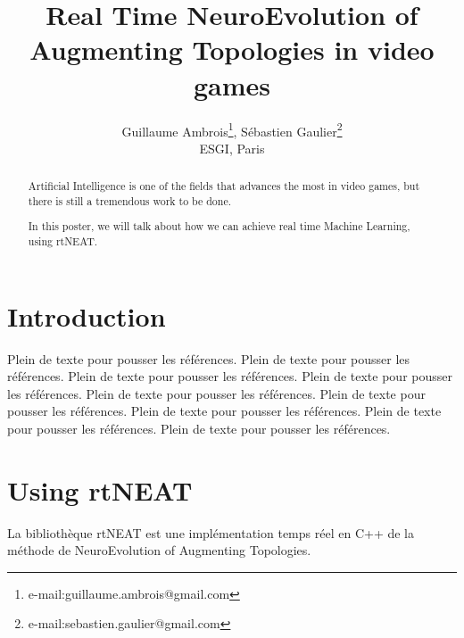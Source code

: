 \documentclass[conference]{acmsiggraph}
\title{Real Time NeuroEvolution of Augmenting Topologies in video games}
\author{Guillaume Ambrois\thanks{e-mail:guillaume.ambrois@gmail.com}, Sébastien Gaulier\thanks{e-mail:sebastien.gaulier@gmail.com}\\ESGI, Paris}
\begin{document}


\maketitle

\begin{abstract}

Artificial Intelligence is one of the fields that advances the most in video games, but there is still a tremendous work to be done.

In this poster, we will talk about how we can achieve real time Machine Learning, using rtNEAT.

\end{abstract}

\keywordlist


\copyrightspace

\section{Introduction}

Plein de texte pour pousser les références.
Plein de texte pour pousser les références.
Plein de texte pour pousser les références.
Plein de texte pour pousser les références.
Plein de texte pour pousser les références.
Plein de texte pour pousser les références.
Plein de texte pour pousser les références.
Plein de texte pour pousser les références.
Plein de texte pour pousser les références.

\section{Using rtNEAT}

La bibliothèque rtNEAT est une implémentation temps réel en C++ de la méthode de NeuroEvolution of Augmenting Topologies.
\end{document}

